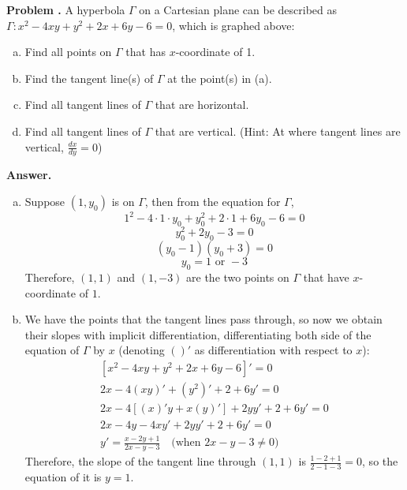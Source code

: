 \documentclass[11pt,letterpaper]{article}
\newcounter{problem}
\newcommand{\problem}{
	\stepcounter{problem}%
	\noindent \textbf{Problem \theproblem. }%
}
\newcommand{\answer}{\noindent \textbf{Answer. }}
\begin{document}
\problem A hyperbola $\Gamma$ on a Cartesian plane can be described as $\Gamma:x^2-4xy+y^2+2x+6y-6=0$, which is graphed above:
\begin{enumerate}[(a)]
    \item Find all points on $\Gamma$ that has $x$-coordinate of 1.
    \item Find the tangent line(s) of $\Gamma$ at the point(s) in (a).
    \item Find all tangent lines of $\Gamma$ that are horizontal.
    \item Find all tangent lines of $\Gamma$ that are vertical. (Hint: At where tangent lines are vertical, $\frac{dx}{dy} = 0$)
\end{enumerate}\vspace{6mm}

\answer
\begin{enumerate}[(a)]
    \item Suppose $(1, y_0)$ is on $\Gamma$, then from the equation for $\Gamma$, 
    \[1^2 - 4 \cdot 1 \cdot y_0 + y_0^2 + 2 \cdot 1 + 6 y_0 - 6 =0\]
    \[y_0^2 + 2y_0 -3 = 0\]
    \[(y_0 - 1)(y_0 + 3) = 0\]
    \[y_0 = 1 \text{ or } -3\]
    Therefore, $(1, 1)$ and $(1, -3)$ are the two points on $\Gamma$ that have $x$-coordinate of $1$. 
    \item We have the points that the tangent lines pass through, so now we obtain their slopes with implicit differentiation, differentiating both side of the equation of $\Gamma$ by $x$ (denoting $()'$ as differentiation with respect to $x$):
    \begin{gather*}
        \left[x^2-4xy+y^2+2x+6y-6\right]' = 0\\
        2x - 4(xy)' + (y^2)' + 2 + 6y' = 0\\
        2x - 4[(x)'y + x(y)'] + 2yy' + 2 + 6y' = 0\\
        2x - 4y - 4xy' + 2yy' + 2 + 6y' = 0\\
        y' = \frac{x-2y+1}{2x-y-3} \quad \text{(when } 2x-y-3 \ne 0 \text{)}
    \end{gather*}
    Therefore, the slope of the tangent line through $(1, 1)$ is $\frac{1-2+1}{2-1-3} = 0$, so the equation of it is $y = 1$.  
    

\end{enumerate}
\end{document}
